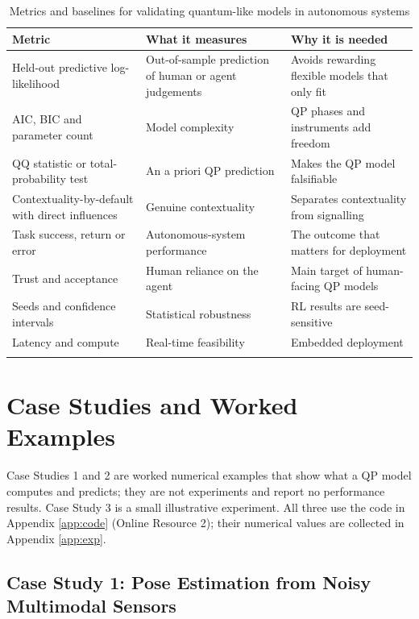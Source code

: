 \documentclass[pdflatex,sn-basic]{sn-jnl}
\begin{document}
\begin{table}[ht]
\caption{Metrics and baselines for validating quantum-like models in autonomous systems}\label{tab:metrics}%
\footnotesize
\begin{tabular}{@{}>{\raggedright\arraybackslash}p{0.320\dimexpr\textwidth-6\tabcolsep\relax}>{\raggedright\arraybackslash}p{0.340\dimexpr\textwidth-6\tabcolsep\relax}>{\raggedright\arraybackslash}p{0.340\dimexpr\textwidth-6\tabcolsep\relax}@{}}
\toprule
\textbf{Metric} & \textbf{What it measures} & \textbf{Why it is needed} \\ \midrule
Held-out predictive log-likelihood & Out-of-sample prediction of human or agent judgements & Avoids rewarding flexible models that only fit \\
AIC, BIC and parameter count & Model complexity & QP phases and instruments add freedom \\
QQ statistic or total-probability test & An a priori QP prediction & Makes the QP model falsifiable \\
Contextuality-by-default with direct influences & Genuine contextuality & Separates contextuality from signalling \\
Task success, return or error & Autonomous-system performance & The outcome that matters for deployment \\
Trust and acceptance & Human reliance on the agent & Main target of human-facing QP models \\
Seeds and confidence intervals & Statistical robustness & RL results are seed-sensitive \\
Latency and compute & Real-time feasibility & Embedded deployment \\
\botrule
\end{tabular}
\end{table}


\section{Case Studies and Worked Examples}\label{sec:cases}
Case Studies 1 and 2 are worked numerical examples that show what a QP model computes and predicts; they are not experiments and report no performance results. Case Study 3 is a small illustrative experiment. All three use the code in Appendix \ref{app:code} (Online Resource 2); their numerical values are collected in Appendix \ref{app:exp}.

\subsection{Case Study 1: Pose Estimation from Noisy Multimodal Sensors}\label{sec:case-fusion}
\end{document}
